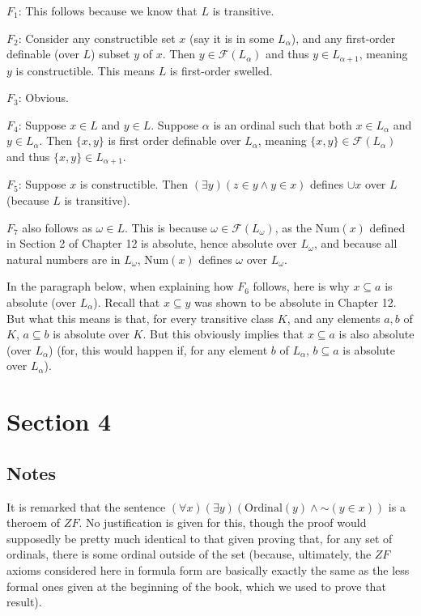 \documentclass{article}
\newcommand*{\oldneg}{\mathord{\sim}}
\theoremstyle{definition}
\begin{document}
$F_1$: This follows because we know that $L$ is transitive.

$F_2$: Consider any constructible set $x$ (say it is in some $L_\alpha$), and any first-order definable (over $L$) subset $y$ of $x$. Then 
$y\in\mathcal{F}(L_\alpha)$ and thus $y\in L_{\alpha+1}$, meaning $y$ is constructible. This means $L$ is first-order swelled.

$F_3$: Obvious.

$F_4$: Suppose $x\in L$ and $y\in L$. Suppose $\alpha$ is an ordinal such that both $x\in L_\alpha$ and 
$y\in L_\alpha$. Then $\{x,y\}$ is first order definable over $L_\alpha$, meaning $\{x,y\}\in\mathcal{F}(L_\alpha)$ and 
thus $\{x,y\}\in L_{\alpha+1}$.

$F_5$: Suppose $x$ is constructible. Then $(\exists y)(z\in y\wedge y\in x)$ defines $\cup x$ over $L$
(because $L$ is transitive).

$F_7$ also follows as $\omega\in L$. This is because 
$\omega\in\mathcal{F}(L_\omega)$, as the $\textrm{Num}(x)$ defined in Section 2 of Chapter 12 is absolute, hence 
absolute over $L_\omega$, and because all natural numbers are in $L_\omega$, $\textrm{Num}(x)$ defines 
$\omega$ over $L_\omega$.

In the paragraph below, when explaining how $F_6$ follows, here is why $x\subseteq a$ is absolute (over $L_\alpha$). Recall that 
$x\subseteq y$ was shown to be absolute in Chapter 12. But what this means is that, for every transitive class $K$, and any 
elements $a,b$ of $K$, $a\subseteq b$ is absolute over $K$. But this obviously implies that $x\subseteq a$ is also 
absolute (over $L_\alpha$) (for, this would happen if, for any element $b$ of $L_\alpha$, $b\subseteq a$ is absolute
over $L_\alpha$). 

\section*{Section 4}

\subsection*{Notes}
It is remarked that the sentence $(\forall x)(\exists y)(\textrm{Ordinal}(y)\wedge\oldneg(y\in x))$ is a theroem of $ZF$. No 
justification is given for this, though the proof would supposedly be pretty much identical to that given proving that, 
for any set of ordinals, there is some ordinal outside of the set (because, ultimately, the $ZF$ axioms considered here in 
formula form are basically exactly the same as the less formal ones given at the beginning of the book, which we used to prove 
that result).
\end{document}
